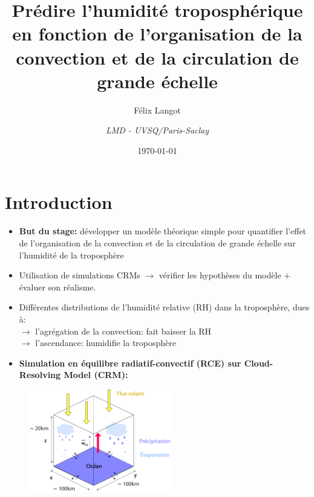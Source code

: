 \documentclass[10pt]{beamer}
\title{Prédire l'humidité troposphérique en fonction de l'organisation de la convection et de la circulation de grande échelle}
\subtitle{Félix Langot}
\date{\today}
\author{\textit{LMD - UVSQ/Paris-Saclay}}
\institute{}
\begin{document}
\maketitle

\section*{Introduction}
\begin{frame}{\secname}

    \begin{itemize}
        \setlength{\itemsep}{7pt}
        \item \textbf{But du stage:} développer un modèle théorique simple pour quantifier l'effet de l'organisation de la convection et de la circulation de grande échelle sur l'humidité de la troposphère 
        \item Utilisation de simulations CRMs $\rightarrow$ vérifier les hypothèses du modèle + évaluer son réalisme. 
        \item Différentes distributions de l'humidité relative (RH) dans la troposphère, dues à: \\
        $\rightarrow$ l'agrégation de la convection: fait baisser la RH  \\
        $\rightarrow$ l'ascendance: humidifie la troposphère \\
        \autocite{Tobin2012}
    \end{itemize}

\end{frame}

\begin{frame}{\secname}
    \begin{itemize}
        \item \textbf{Simulation en équilibre radiatif-convectif (RCE) sur Cloud-Resolving  Model  (CRM):}
    \end{itemize}
    \begin{figure}[hbtp]
        \centering
        \includegraphics[width=6.2cm]{Figures/CRM.png}    
    \end{figure}
\end{frame}
\end{document}

